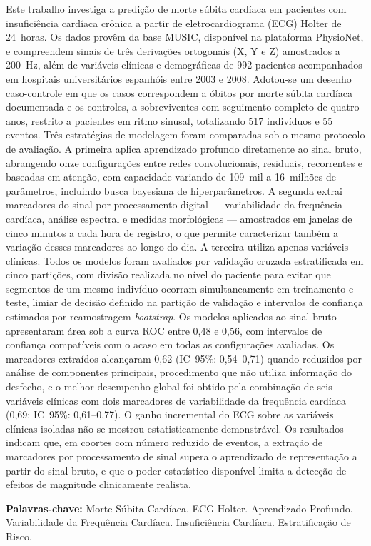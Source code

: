 Este trabalho investiga a predição de morte súbita cardíaca em pacientes com
insuficiência cardíaca crônica a partir de eletrocardiograma (ECG) Holter de
24~horas. Os dados provêm da base MUSIC, disponível na plataforma PhysioNet, e
compreendem sinais de três derivações ortogonais (X, Y e Z) amostrados a
200~Hz, além de variáveis clínicas e demográficas de 992 pacientes
acompanhados em hospitais universitários espanhóis entre 2003 e 2008. Adotou-se
um desenho caso-controle em que os casos correspondem a óbitos por morte súbita
cardíaca documentada e os controles, a sobreviventes com seguimento completo de
quatro anos, restrito a pacientes em ritmo sinusal, totalizando 517 indivíduos
e 55 eventos. Três estratégias de modelagem foram comparadas sob o mesmo
protocolo de avaliação. A primeira aplica aprendizado profundo diretamente ao
sinal bruto, abrangendo onze configurações entre redes convolucionais,
residuais, recorrentes e baseadas em atenção, com capacidade variando de
109~mil a 16~milhões de parâmetros, incluindo busca bayesiana de
hiperparâmetros. A segunda extrai marcadores do sinal por processamento
digital --- variabilidade da frequência cardíaca, análise espectral e medidas
morfológicas --- amostrados em janelas de cinco minutos a cada hora de
registro, o que permite caracterizar também a variação desses marcadores ao
longo do dia. A terceira utiliza apenas variáveis clínicas. Todos os modelos
foram avaliados por validação cruzada estratificada em cinco partições, com
divisão realizada no nível do paciente para evitar que segmentos de um mesmo
indivíduo ocorram simultaneamente em treinamento e teste, limiar de decisão
definido na partição de validação e intervalos de confiança estimados por
reamostragem \textit{bootstrap}. Os modelos aplicados ao sinal bruto
apresentaram área sob a curva ROC entre 0,48 e 0,56, com intervalos de
confiança compatíveis com o acaso em todas as configurações avaliadas. Os
marcadores extraídos alcançaram 0,62 (IC~95\%: 0,54--0,71) quando reduzidos por
análise de componentes principais, procedimento que não utiliza informação do
desfecho, e o melhor desempenho global foi obtido pela combinação de seis
variáveis clínicas com dois marcadores de variabilidade da frequência cardíaca
(0,69; IC~95\%: 0,61--0,77). O ganho incremental do ECG sobre as variáveis
clínicas isoladas não se mostrou estatisticamente demonstrável. Os resultados
indicam que, em coortes com número reduzido de eventos, a extração de
marcadores por processamento de sinal supera o aprendizado de representação a
partir do sinal bruto, e que o poder estatístico disponível limita a detecção
de efeitos de magnitude clinicamente realista.

\textbf{Palavras-chave:} Morte Súbita Cardíaca. ECG Holter. Aprendizado
Profundo. Variabilidade da Frequência Cardíaca. Insuficiência Cardíaca.
Estratificação de Risco.